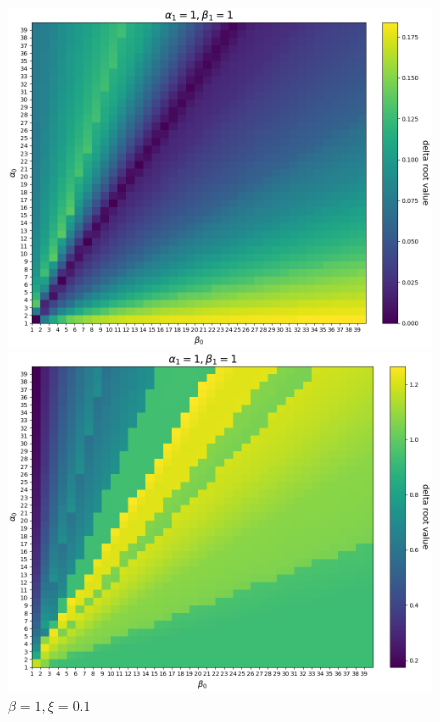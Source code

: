 \documentclass{article}
\begin{document}
\begin{figure}[ht!]
    \begin{minipage}{0.49\textwidth}
        \centering
        \includegraphics[width=1\textwidth]{../../../../bandit/data/convergence/num_replays/temp1/value_diff_horizon4_alpha1_beta1_xi0001_temp1.png}
        \caption{$\beta=1, \xi=0.001$}
    \end{minipage}%
    \begin{minipage}{0.49\textwidth}
        \centering
        \includegraphics[width=1\textwidth]{../../../../bandit/data/convergence/num_replays/temp1/value_diff_horizon4_alpha1_beta1_xi01_temp1.png}
        \caption{$\beta=1, \xi=0.1$}
    \end{minipage}
\end{figure}
\end{document}

